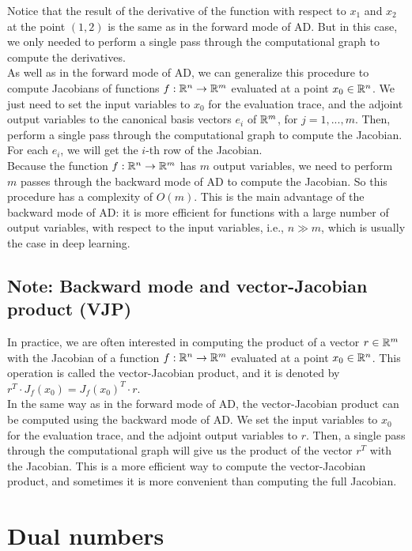 Notice that the result of the derivative of the function with respect to $x_1$ and $x_2$ at the point
$(1, 2)$ is the same as in the forward mode of AD. But in this case, we only needed to perform a single
pass through the computational graph to compute the derivatives.\\

As well as in the forward mode of AD, we can generalize this procedure to compute Jacobians of functions
$f: \mathbb{R}^n \to \mathbb{R}^m$ evaluated at a point $x_0 \in \mathbb{R}^n$. We just need to set the input variables to $x_0$ for
the evaluation trace, and the adjoint output variables to the canonical basis vectors $e_i$ of $\mathbb{R}^m$, 
for $j = 1, ..., m$. Then, perform a single pass through the computational graph to compute the Jacobian. 
For each $e_i$, we will get the $i$-th row of the Jacobian.\\

Because the function $f: \mathbb{R}^n \to \mathbb{R}^m$ has $m$ output variables, we need to perform $m$ passes through the
backward mode of AD to compute the Jacobian. So this procedure has a complexity of $O(m)$. This is the main
advantage of the backward mode of AD: it is more efficient for functions with a large number of output variables,
with respect to the input variables, i.e., $n \gg m$, which is usually the case in deep learning.

\subsection{Note: Backward mode and vector-Jacobian product (VJP)}

In practice, we are often interested in computing the product of a vector $r \in \mathbb{R}^m$ with the Jacobian of a
function $f: \mathbb{R}^n \to \mathbb{R}^m$ evaluated at a point $x_0 \in \mathbb{R}^n$. This operation is called the vector-Jacobian
product, and it is denoted by $r^T \cdot J_f(x_0) = J_f(x_0)^T \cdot r$.\\

In the same way as in the forward mode of AD, the vector-Jacobian product can be computed using the backward mode
of AD. We set the input variables to $x_0$ for the evaluation trace, and the adjoint output variables to $r$.
Then, a single pass through the computational graph will give us the product of the vector $r^T$ with the Jacobian.
This is a more efficient way to compute the vector-Jacobian product, and sometimes it is more convenient than
computing the full Jacobian.


\section{Dual numbers}


